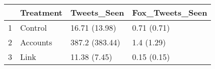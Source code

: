 \begin{table}[ht]
\centering
\begin{tabular}{rlll}
  \hline
 & Treatment & Tweets\_Seen & Fox\_Tweets\_Seen \\ 
  \hline
1 & Control & 16.71 (13.98) & 0.71 (0.71) \\ 
  2 & Accounts & 387.2 (383.44) & 1.4 (1.29) \\ 
  3 & Link & 11.38 (7.45) & 0.15 (0.15) \\ 
   \hline
\end{tabular}
\end{table}

